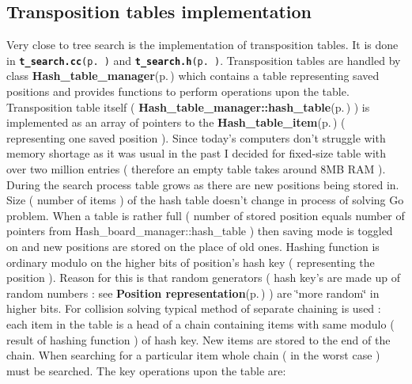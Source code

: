 \subsection{Transposition tables implementation}\label{page_3_page__1_section_2}
Very close to tree search is the implementation of transposition tables. It is done in {\tt {\bf t\_\-search.cc}{\rm (p.\,\pageref{t__search_8cc})}} and {\tt {\bf t\_\-search.h}{\rm (p.\,\pageref{t__search_8h})}}. Transposition tables are handled by class {\bf Hash\_\-table\_\-manager}{\rm (p.\,\pageref{classHash__table__manager})} which contains a table representing saved positions and provides functions to perform operations upon the table. Transposition table itself ( {\bf Hash\_\-table\_\-manager::hash\_\-table}{\rm (p.\,\pageref{classHash__table__manager_r1})} ) is implemented as an array of pointers to the {\bf Hash\_\-table\_\-item}{\rm (p.\,\pageref{classHash__table__item})} ( representing one saved position ). Since today's computers don't struggle with memory shortage as it was usual in the past I decided for fixed-size table with over two million entries ( therefore an empty table takes around 8MB RAM ). During the search process table grows as there are new positions being stored in. Size ( number of items ) of the hash table doesn't change in process of solving Go problem. When a table is rather full ( number of stored position equals number of pointers from Hash\_\-board\_\-manager::hash\_\-table ) then saving mode is toggled on and new positions are stored on the place of old ones. Hashing function is ordinary modulo on the higher bits of position's hash key ( representing the position ). Reason for this is that random generators ( hash key's are made up of random numbers : see {\bf Position representation}{\rm (p.\,\pageref{page_6})} ) are \char`\"{}more random\char`\"{} in higher bits. For collision solving typical method of separate chaining is used : each item in the table is a head of a chain containing items with same modulo ( result of hashing function ) of hash key. New items are stored to the end of the chain. When searching for a particular item whole chain ( in the worst case ) must be searched. The key operations upon the table are:

